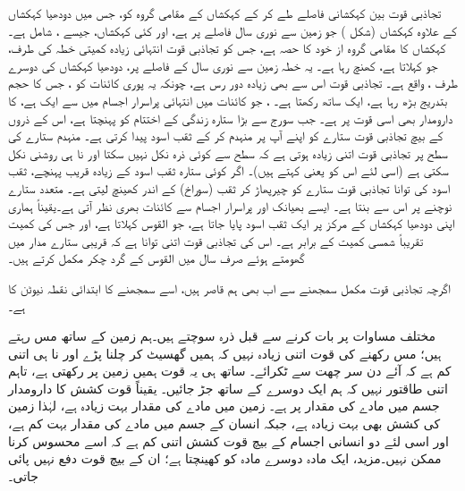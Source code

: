 تجاذبی قوت  بین کہکشانی  فاصلے طے کر کے کہکشاں کے مقامی گروہ کو، جس میں دودھیا کہکشاں کے علاوہ کہکشاں (شکل ) جو زمین  سے  نوری سال فاصلے پر ہے،   اور کئی  کہکشاں، جیسے ، شامل ہے۔ کہکشاں کا مقامی گروہ   از خود  کا حصہ ہے، جس کو تجاذبی قوت  انتہائی زیادہ کمیتی خطہ کی طرف، جو   کہلاتا ہے،  کھنچ رہا ہے۔ یہ خطہ زمین سے   نوری سال کے فاصلے پر، دودھیا کہکشاں کی دوسرے طرف ، واقع ہے۔ تجاذبی قوت اس سے بھی زیادہ دور رس ہے، چونکہ یہ پوری کائنات کو ، جس کا حجم بتدریج بڑھ  رہا ہے،  ایک ساتھ رکھتا ہے۔
   ، جو کائنات میں انتہائی پراسرار اجسام میں سے ایک ہے، کا دارومدار بھی اسی قوت پر ہے۔ جب  سورج  سے بڑا  ستارہ   زندگی کے اختتام کو پہنچتا ہے،  اس کے ذروں کے  بیچ تجاذبی قوت   ستارے کو   اپنے آپ پر  منہدم   کر کے ثقب اسود پیدا کرتی ہے۔ منہدم ستارے کی سطح پر تجاذبی قوت اتنی زیادہ   ہوتی ہے  کہ سطح سے   کوئی ذرہ نکل نہیں سکتا اور نا ہی  روشنی نکل سکتی ہے (اسی لئے اس کو   یعنی  کہتے ہیں)۔ اگر کوئی ستارہ ثقب اسود کے زیادہ قریب پہنچے، ثقب اسود  کی توانا  تجاذبی قوت   ستارے کو   چیرپھاڑ  کر  ثقب (سوراخ) کے اندر کھینچ لیتی ہے۔ متعدد ستارے نوچنے   پر اس سے    بنتا ہے۔ ایسے  بھیانک  اور پراسرار اجسام سے کائنات  بھری نظر آتی ہے۔یقیناً  ہماری اپنی دودھیا کہکشاں  کے مرکز پر  ایک ثقب اسود پایا جاتا ہے، جو   القوس   کہلاتا ہے، اور جس کی کمیت تقریباً   شمسی  کمیت کے برابر   ہے۔ اس کی تجاذبی قوت اتنی توانا ہے کہ   قریبی ستارے مدار میں گھومتے  ہوئے صرف  سال میں القوس  کے گرد  چکر مکمل کرتے ہیں۔

اگرچہ  تجاذبی قوت  مکمل سمجھنے سے اب بھی ہم قاصر ہیں، اسے سمجھنے کا ابتدائی نقطہ  نیوٹن کا  ہے۔

مختلف مساوات پر بات کرنے سے قبل ذرہ سوچتے ہیں۔ہم زمین   کے ساتھ مس رہتے ہیں؛ مس رکھنے کی قوت اتنی زیادہ نہیں کہ ہمیں گھسیٹ کر چلنا پڑے اور نا ہی اتنی کم ہے کہ آئے دن سر چھت سے ٹکرائے۔ ساتھ ہی یہ قوت ہمیں زمین پر رکھتی ہے، تاہم اتنی طاقتور نہیں کہ ہم ایک دوسرے کے ساتھ جڑ جائیں۔ یقیناً  قوت کشش کا دارومدار  جسم میں مادے کی مقدار پر ہے۔ زمین میں مادے کی مقدار بہت  زیادہ ہے، لہٰذا زمین  کی کشش بھی بہت زیادہ ہے، جبکہ  انسان کے جسم میں مادے کی مقدار بہت کم ہے، اور اسی لئے دو انسانی اجسام کے بیچ قوت کشش  اتنی کم ہے کہ اسے محسوس کرنا ممکن نہیں۔مزید، ایک  مادہ  دوسرے مادہ کو کھینچتا ہے؛ ان کے بیچ قوت دفع نہیں پائی جاتی۔

